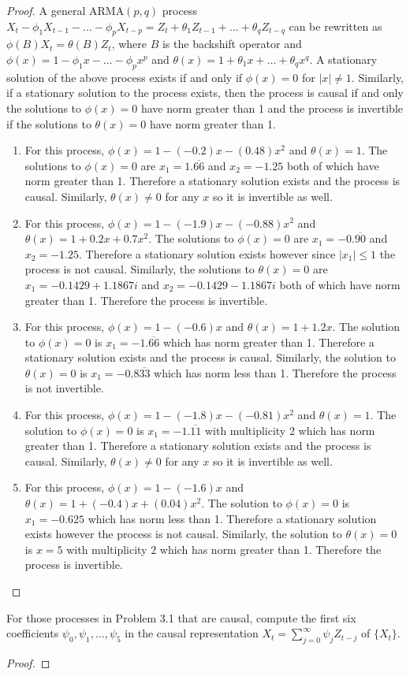 \documentclass[12pt]{article}
\theoremstyle{definition}
\newenvironment{custompbm}[1]
  {\renewcommand\theproblem{#1}\problem}
  {\endproblem}
\begin{document}
\begin{proof}
  A general $\text{ARMA}(p, q)$ process
  $X_t - \phi_1 X_{t-1} - \dots - \phi_p X_{t-p} = Z_t + \theta_1 Z_{t-1} + \dots + \theta_q Z_{t-q}$
  can be rewritten as $\phi(B)X_t = \theta(B)Z_t$, where $B$ is the backshift
  operator and $\phi(x) = 1 - \phi_1 x - \dots - \phi_p x^p$ and
  $\theta(x) = 1 + \theta_1 x + \dots + \theta_q x^q$. A stationary solution of the
  above process exists if and only if $\phi(x) = 0$ for $|x| \ne 1$. Similarly,
  if a stationary solution to the process exists, then the process is causal
  if and only the solutions to $\phi(x) = 0$ have norm greater than 1 and the
  process is invertible if the solutions to $\theta(x) = 0$ have norm greater
  than 1.
  \begin{enumerate}
    \item For this process, $\phi(x) = 1 - (-0.2)x - (0.48)x^2$ and
      $\theta(x) = 1$. The solutions to $\phi(x) = 0$ are $x_1 = 1.\overline{66}$ and $x_2=-1.25$
      both of which have norm greater than 1. Therefore a stationary solution
      exists and the process is causal. Similarly, $\theta(x) \ne 0$ for any
      $x$ so it is invertible as well.
    \item For this process, $\phi(x) = 1 - (-1.9)x - (-0.88)x^2$ and
      $\theta(x) = 1 + 0.2x + 0.7x^2$. The solutions to $\phi(x) = 0$ are
      $x_1 = -0.\overline{90}$ and $x_2 =-1.25$. Therefore a stationary solution
      exists however since $|x_1| \leq 1$ the process is not causal. Similarly, the
      solutions to $\theta(x) = 0$ are $x_1 = -0.1429 + 1.1867i$
      and $x_2 =  -0.1429 - 1.1867i$ both of
      which have norm greater than 1. Therefore the process is invertible.
    \item For this process, $\phi(x) = 1 - (-0.6)x$ and
      $\theta(x) = 1 + 1.2x$. The solution to $\phi(x) = 0$ is
      $x_1 = -1.\overline{66}$ which has norm greater than 1. Therefore a stationary solution
      exists and the process is causal. Similarly, the
      solution to $\theta(x) = 0$ is $x_1 = -0.8\overline{33}$ which has norm
      less than 1. Therefore the process is not invertible.
    \item For this process, $\phi(x) = 1 - (-1.8)x - (-0.81)x^2$ and
      $\theta(x) = 1$. The solution to $\phi(x) = 0$ is $x_1 = -1.\overline{11}$ with multiplicity 2
      which has norm greater than 1. Therefore a stationary solution
      exists and the process is causal. Similarly, $\theta(x) \ne 0$ for any
      $x$ so it is invertible as well.
    \item For this process, $\phi(x) = 1 - (-1.6)x$ and
      $\theta(x) = 1 + (-0.4)x + (0.04)x^2$. The solution to $\phi(x) = 0$ is
      $x_1 = -0.625$ which has norm less than 1. Therefore a stationary solution
      exists however the process is not causal. Similarly, the
      solution to $\theta(x) = 0$ is $x = 5$ with multiplicity 2 which has norm
      greater than 1. Therefore the process is invertible.
  \end{enumerate}
\end{proof}


\begin{custompbm}{3.3}
  For those processes in Problem 3.1 that are causal, compute the first six
  coefficients $\psi_0, \psi_1, \dots, \psi_5$ in the causal representation
  $X_t = \sum_{j=0}^\infty \psi_j Z_{t-j}$ of $\{X_t\}$.
\end{custompbm}

\begin{proof}
\end{proof}
\end{document}

